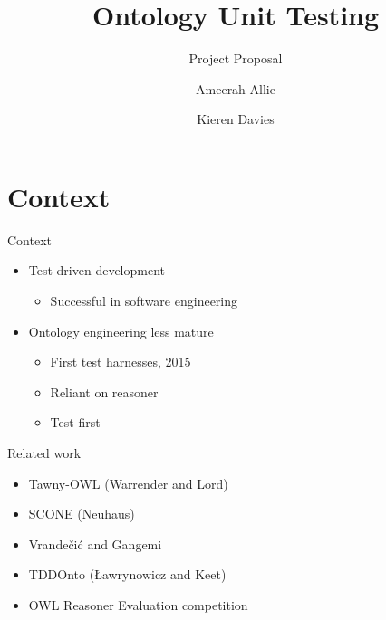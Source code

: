 \documentclass[17pt,mathserif]{beamer}
\begin{document}
\title{Ontology Unit Testing}
\subtitle{Project Proposal}
\author{Ameerah Allie \and Kieren Davies}
\date{}
\titlepage


\section{Context}

\begin{frame}{Context}
  \begin{itemize}
    \item Test-driven development
    \begin{itemize}
      \item Successful in software engineering
    \end{itemize}
    \item Ontology engineering less mature
    \begin{itemize}
      \item First test harnesses, 2015
      \item Reliant on reasoner
      \item Test-first
    \end{itemize}
  \end{itemize}
\end{frame}

\begin{frame}{Related work}
  \begin{itemize}
    \item Tawny-OWL (Warrender and Lord)
    \item SCONE (Neuhaus)
    \item Vrande\v{c}i\'c and Gangemi
    \item TDDOnto ({\L}awrynowicz and Keet)
    \item OWL Reasoner Evaluation competition
  \end{itemize}
\end{frame}
\end{document}
